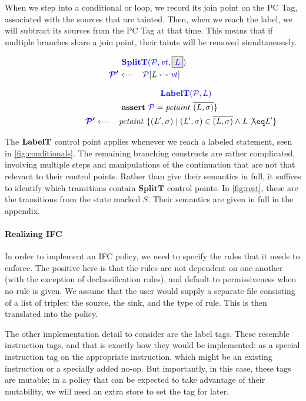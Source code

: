 \documentclass[acmsmall,review,anonymous]{acmart}\settopmatter{printfolios=true,printccs=false,printacmref=false}
\begin{document}
When we step into a conditional or loop, we record its join point on the PC Tag, associated with the sources
that are tainted. Then, when we reach the label, we will subtract its sources from the PC Tag at that time.
This means that if multiple branches share a join point, their taints will be removed simultaneously.

\begin{minipage}[t]{.25\textwidth}
\[\begin{aligned}
\truledef{\splitt}
\settag{\PCT'}{\PCT[L \rightarrowtail \vt]}
\end{aligned}\]
\end{minipage}
\begin{minipage}[t]{.74\textwidth}
\[\begin{aligned}
\truledef{\labelt}
\assert{\PCT = \mathit{pctaint} ~ \overline{(L,\sigma)}\}}
\settag{\PCT'}{\mathit{pctaint} ~ \{(L',\sigma) \mid (L',\sigma) \in \overline{(L,\sigma)} \land L \not \eq L'\}}
\end{aligned}\]
\end{minipage}

The \(\mathbf{LabelT}\) control point applies whenever we reach a labeled statement, seen
in \cref{fig:conditionals}.
The remaining branching constructs are rather complicated, involving multiple steps
and manipulations of the continuation that are not that relevant to their control
points. Rather than give their semantics in full, it suffices to identify which
transitions contain \(\mathbf{SplitT}\) control points. In \cref{fig:rest}, these
are the transitions from the state marked \(S\). Their semantics are given in full
in the appendix.

\paragraph*{Realizing IFC}

In order to implement an IFC policy, we need to specify the rules that it needs to enforce.
The positive here is that the rules are not dependent on one another (with the exception of
declassification rules), and default to permissiveness when no rule is given. We assume that
the user would supply a separate file consisting of a list of triples: the source, the sink,
and the type of rule. This is then translated into the policy.

The other implementation detail to consider are the label tags. These resemble
instruction tags, and that is exactly how they would be implemented: as a special instruction
tag on the appropriate instruction, which might be an existing instruction or a specially
added no-op. But importantly, in this case, these tags are mutable; in a policy that can be
expected to take advantage of their mutability, we will need an extra store to set the tag
for later.
\end{document}
